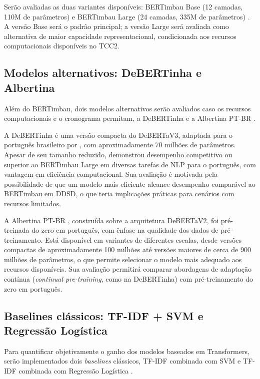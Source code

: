 \documentclass[
    12pt,                %
    openright,           %
    oneside,             %
    a4paper,             %
    english,             %
    brazil               %
]{abntex2}
\begin{document}
Serão avaliadas as duas variantes disponíveis: BERTimbau Base (12 camadas, 110M de parâmetros) e BERTimbau Large (24 camadas, 335M de parâmetros) \cite{Souza2020}. A versão Base será o padrão principal; a versão Large será avaliada como alternativa de maior capacidade representacional, condicionada aos recursos computacionais disponíveis no TCC2.

\subsection{Modelos alternativos: DeBERTinha e Albertina}
\label{sec:modelos_alternativos}

Além do BERTimbau, dois modelos alternativos serão avaliados caso os recursos computacionais e o cronograma permitam, a DeBERTinha \cite{Abonizio2023} e a Albertina PT-BR \cite{Rodrigues2023}.

A DeBERTinha é uma versão compacta do DeBERTaV3, adaptada para o português brasileiro por , com aproximadamente 70 milhões de parâmetros. Apesar de seu tamanho reduzido, demonstrou desempenho competitivo ou superior ao BERTimbau Large em diversas tarefas de NLP para o português, com vantagem em eficiência computacional. Sua avaliação é motivada pela possibilidade de que um modelo mais eficiente alcance desempenho comparável ao BERTimbau em DDSD, o que teria implicações práticas para cenários com recursos limitados.

A Albertina PT-BR \cite{Rodrigues2023}, construída sobre a arquitetura DeBERTaV2, foi pré-treinada do zero em português, com ênfase na qualidade dos dados de pré-treinamento. Está disponível em variantes de diferentes escalas, desde versões compactas de aproximadamente 100 milhões até versões maiores de cerca de 900 milhões de parâmetros, o que permite selecionar o modelo mais adequado aos recursos disponíveis. Sua avaliação permitirá comparar abordagens de adaptação contínua (\textit{continual pre-training}, como na DeBERTinha) com pré-treinamento do zero em português.

\subsection{Baselines clássicos: TF-IDF + SVM e Regressão Logística}
\label{sec:baselines}

Para quantificar objetivamente o ganho dos modelos baseados em Transformers, serão implementados dois \textit{baselines} clássicos, TF-IDF combinada com SVM e TF-IDF combinada com Regressão Logística \cite{Manning2008}.
\end{document}
